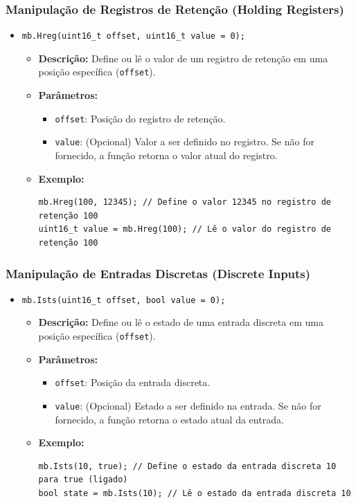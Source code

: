 \subsubsection{Manipulação de Registros de Retenção (Holding Registers)}
\begin{itemize}
    \item \texttt{mb.Hreg(uint16\_t offset, uint16\_t value = 0);}
    \begin{itemize}
        \item \textbf{Descrição:} Define ou lê o valor de um registro de retenção em uma posição específica (\texttt{offset}).
        \item \textbf{Parâmetros:}
        \begin{itemize}
            \item \texttt{offset}: Posição do registro de retenção.
            \item \texttt{value}: (Opcional) Valor a ser definido no registro. Se não for fornecido, a função retorna o valor atual do registro.
        \end{itemize}
        \item \textbf{Exemplo:}
        \begin{verbatim}
mb.Hreg(100, 12345); // Define o valor 12345 no registro de retenção 100
uint16_t value = mb.Hreg(100); // Lê o valor do registro de retenção 100
        \end{verbatim}
    \end{itemize}
\end{itemize}

\subsubsection{Manipulação de Entradas Discretas (Discrete Inputs)}
\begin{itemize}
    \item \texttt{mb.Ists(uint16\_t offset, bool value = 0);}
    \begin{itemize}
        \item \textbf{Descrição:} Define ou lê o estado de uma entrada discreta em uma posição específica (\texttt{offset}).
        \item \textbf{Parâmetros:}
        \begin{itemize}
            \item \texttt{offset}: Posição da entrada discreta.
            \item \texttt{value}: (Opcional) Estado a ser definido na entrada. Se não for fornecido, a função retorna o estado atual da entrada.
        \end{itemize}
        \item \textbf{Exemplo:}
        \begin{verbatim}
mb.Ists(10, true); // Define o estado da entrada discreta 10 para true (ligado)
bool state = mb.Ists(10); // Lê o estado da entrada discreta 10
        \end{verbatim}
    \end{itemize}
\end{itemize}

